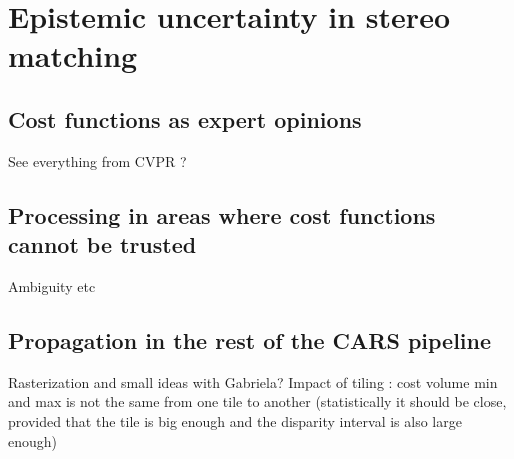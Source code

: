 \chapter{Epistemic uncertainty in stereo matching}
\section{Cost functions as expert opinions}
See everything from CVPR ?
\section{Processing in areas where cost functions cannot be trusted}
Ambiguity etc
\section{Propagation in the rest of the CARS pipeline}
Rasterization and small ideas with Gabriela?
Impact of tiling : cost volume min and max is not the same from one tile to another (statistically it should be close, provided that the tile is big enough and the disparity interval is also large enough)

\pagebreak